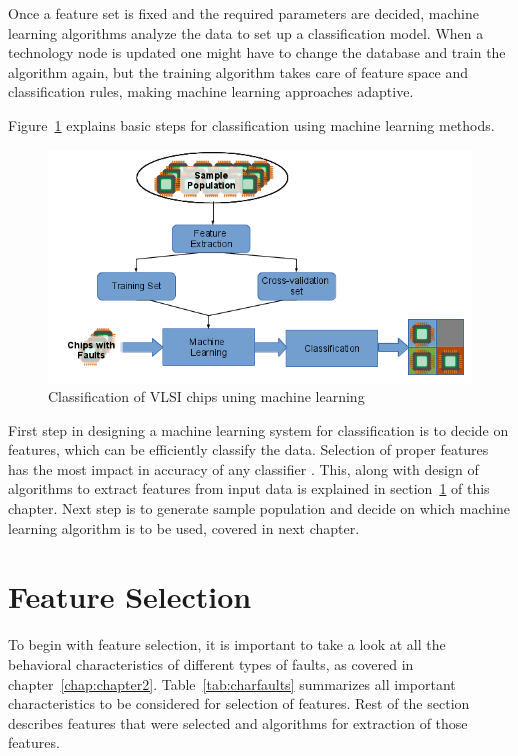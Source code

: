 Once a feature set is fixed and the required parameters are decided, machine learning algorithms analyze the data to set up a classification model. When a technology node is updated one might have to change the database and train the algorithm again, but the training algorithm takes care of feature space and classification rules, making machine learning approaches adaptive.

Figure~\ref{fig:mlsteps} explains basic steps for classification using machine learning methods.

\begin{figure}[h]
  \begin{center}
    \captionsetup{justification=centering}
    \includegraphics[scale=0.75]{figures/mlsteps.png}
    \caption{Classification of VLSI chips uning machine learning}
    \label{fig:mlsteps}
  \end{center}
\end{figure}

First step in designing a machine learning system for classification is to decide on features, which can be efficiently classify the data. Selection of proper features has the most impact in accuracy of any classifier \cite{Michie1994}. This, along with design of algorithms to extract features from input data is explained in section~\ref{sec:secfs} of this chapter. Next step is to generate sample population and decide on which machine learning algorithm is to be used, covered in next chapter.

\section{Feature Selection}
\label{sec:secfs}
To begin with feature selection, it is important to take a look at all the behavioral characteristics of different types of faults, as covered in chapter~\ref{chap:chapter2}. Table~\ref{tab:charfaults} summarizes all important characteristics to be considered for selection of features. Rest of the section describes features that were selected and algorithms for extraction of those features.

